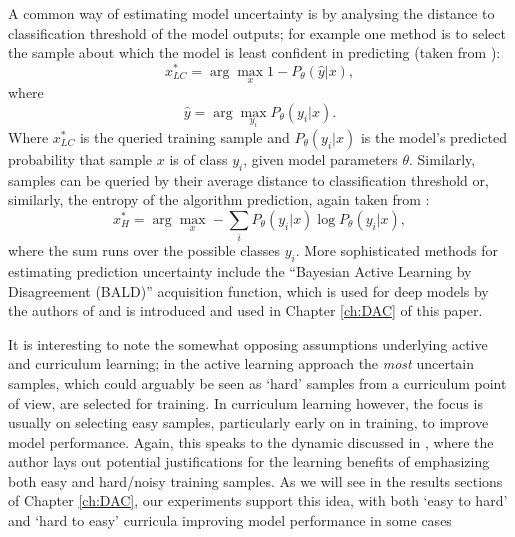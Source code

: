 A common way of estimating model uncertainty is by analysing the distance to classification threshold of the model outputs; for example one method is to select the sample about which the model is least confident in predicting (taken from \cite{settles2012active}):
\begin{equation}
x^{*}_{LC} = \arg\max_{x} 1 - P_{\theta}(\hat{y}|x),
\end{equation}
where
\begin{equation}
\hat{y} = \arg\max_{y_i}P_{\theta}(y_i|x).
\end{equation}
Where $x^{*}_{LC}$ is the queried training sample and $P_{\theta}(y_{i}|x)$ is the model's predicted probability that sample $x$ is of class $y_{i}$, given model parameters $\theta$. Similarly, samples can be queried by their average distance to classification threshold or, similarly, the entropy of the algorithm prediction, again taken from \cite{settles2012active}:
\begin{equation}
x^{*}_{H} = \arg\max_{x} - \sum_{i} P_{\theta}(y_i|x)\log P_{\theta}(y_i|x),
\end{equation}
where the sum runs over the possible classes $y_i$. More sophisticated methods for estimating prediction uncertainty include the ``Bayesian Active Learning by Disagreement (BALD)'' \cite{houlsby2011bayesian} acquisition function, which is used for deep models by the authors of \cite{gal2017deep} and is introduced and used in Chapter \ref{ch:DAC} of this paper.

It is interesting to note the somewhat opposing assumptions underlying active and curriculum learning; in the active learning approach the \textit{most} uncertain samples, which could arguably be seen as `hard' samples from a curriculum point of view, are selected for training. In curriculum learning however, the focus is usually on selecting easy samples, particularly early on in training, to improve model performance. Again, this speaks to the dynamic discussed in \cite{ELMAN199371}, where the author lays out potential justifications for the learning benefits of emphasizing both easy and hard/noisy training samples. As we will see in the results sections of Chapter \ref{ch:DAC}, our experiments support this idea, with both `easy to hard' and `hard to easy' curricula improving model performance in some cases

